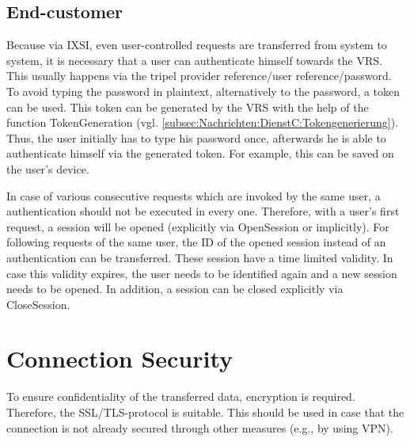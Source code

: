 \subsection*{End-customer}
Because via IXSI, even user-controlled requests are transferred from system to system, it is necessary that a user can authenticate himself towards the VRS.
This usually happens via the tripel provider reference/user reference/password. To avoid typing the password in plaintext, alternatively to the password, a token can be used. This token can be generated by the VRS with the help of the function  TokenGeneration (vgl. \cref{subsec:Nachrichten:DienstC:Tokengenerierung}).
Thus, the user initially has to type his password once, afterwards he is able to authenticate himself via the generated token. For example, this can be saved on the user's device. 

In case of various consecutive requests which are invoked by the same user, a authentication should not be executed in every one. Therefore, with a user's first request, a session will be opened (explicitly via OpenSession or implicitly). For following requests of the same user, the ID of the opened session instead of an authentication can be transferred. These session have a time limited validity. In case this validity expires, the user needs to be identified again and a new session needs to be opened. In addition, a session can be closed explicitly via CloseSession.

\section{Connection Security}
To ensure confidentiality of the transferred data, encryption is required. Therefore, the SSL/TLS-protocol is suitable. This should be used in case that the connection is not already secured through other measures (e.g., by using VPN).
